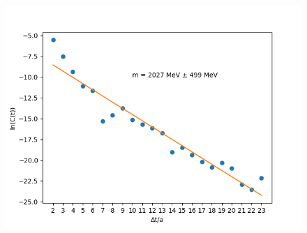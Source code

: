     \begin{figure}[H]
    \centering
        \includegraphics[width=1\textwidth]{images/Log_5ev.png} %
\end{figure}